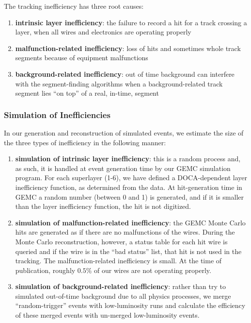 The tracking inefficiency has three root causes:
\begin{enumerate}
\item {\bf intrinsic layer inefficiency}: the failure to record
a hit for a track crossing a layer, when all wires and electronics
are operating properly
\item {\bf malfunction-related inefficiency}: loss of hits and sometimes
whole track segments because of equipment malfunctions
\item {\bf background-related inefficiency}: out of time background
can interfere with the segment-finding algorithms when a background-related
track segment lies ``on top'' of a real, in-time, segment
\end{enumerate}





\subsubsection{Simulation of Inefficiencies}
In our generation and reconstruction of simulated events, we estimate the size of
the three types of inefficiency in the following manner:

\begin{enumerate}
\item {\bf simulation of intrinsic layer inefficiency}: this is a random process
and, as such, it is handled at event generation time by our GEMC simulation
program.  For each superlayer (1-6), we have defined a DOCA-dependent
layer inefficiency function, as determined from the data.  At hit-generation
time in GEMC a random number (between 0 and 1) is generated, and if it is
smaller than the layer inefficiency function, the hit is not digitized.
\item {\bf simulation of malfunction-related inefficiency}: the GEMC Monte
Carlo hits are generated as if there are no malfunctions of the wires.
During the Monte Carlo reconstruction, however, a status table for each
hit wire is queried and if the wire is in the ``bad status'' list, that
hit is not used in the tracking.  The malfunction-related inefficiency  is small.  
At the time of publication,
roughly $0.5\%$ of our wires are not operating properly.  
\item {\bf simulation of background-related inefficiency}: rather than try
to simulated out-of-time background due to all physics processes, we merge
``random-trigger'' events with low-luminosity runs and calculate the
efficiency of these merged events with un-merged low-luminosity events.
\end{enumerate}

